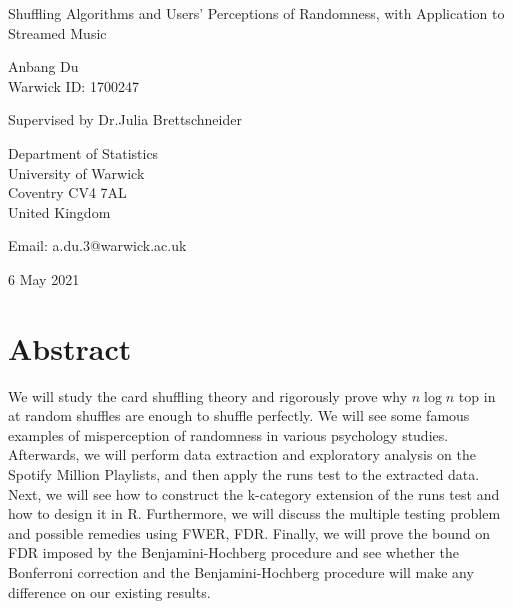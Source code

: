 \documentclass[12pt]{article}
\theoremstyle{plain}
\theoremstyle{definition}
\theoremstyle{remark}
\begin{document}
\thispagestyle{empty}
\begin{center}
{\Huge Shuffling Algorithms and Users’ Perceptions of Randomness, with Application to Streamed Music

\bigskip
\bigskip


\bigskip
\bigskip

\huge Anbang Du\\
\vspace{5pt}
\huge Warwick ID: 1700247\\
\bigskip
\bigskip
\bigskip


\LARGE Supervised by Dr.Julia Brettschneider}
\end{center}
\vfill

\begin{center}
{\Large
Department of Statistics\\
University of Warwick\\
Coventry CV4 7AL\\
United Kingdom\\
\medskip

Email: a.du.3@warwick.ac.uk \\
\medskip

6 May 2021 }
\end{center}
\bigskip

\newpage

\hfill

\hfill

\hfill

\hfill

\section*{Abstract}
We will study the card shuffling theory and rigorously prove why $n\log n$ top in at random shuffles are enough to shuffle perfectly. We will see some famous examples of misperception of randomness in various psychology studies. Afterwards, we will perform data extraction and exploratory analysis on the Spotify Million Playlists, and then apply the runs test to the extracted data. Next, we will see how to construct the k-category extension of the runs test and how to design it in R. Furthermore, we will discuss the multiple testing problem and possible remedies using FWER, FDR. Finally, we will prove the bound on FDR imposed by the Benjamini-Hochberg procedure and see whether the Bonferroni correction and the Benjamini-Hochberg procedure will make any difference on our existing results.
\end{document}
